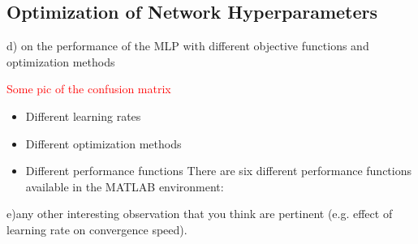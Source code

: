 \FloatBarrier
\subsection{Optimization of Network Hyperparameters}\label{subsec:optNet}
d) on the performance of the MLP with different objective functions and optimization methods

\textcolor{red}{Some pic of the confusion matrix}

\begin{itemize}
   	\item Different learning rates
	    	
   	\item Different optimization methods
   	
   	\item Different performance functions
   	There are six different performance functions available in the MATLAB environment:
   	
   
\end{itemize}
e)any other interesting observation that you think are pertinent (e.g. effect of learning rate on convergence speed).